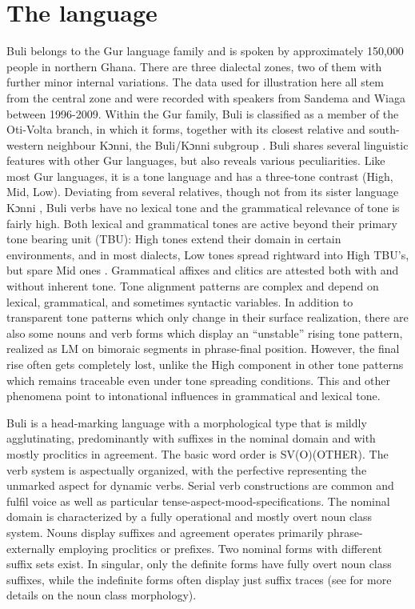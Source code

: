 \documentclass[output=paper]{langsci/langscibook}
\begin{document}
\section{ The language}

Buli belongs to the Gur language family and is spoken by approximately 150,000 people \citep{LewisEtAl2015} in northern Ghana. There are three dialectal zones, two of them with further minor internal variations. The data used for illustration here all stem from the central zone and were recorded with speakers from Sandema and Wiaga between 1996-2009. Within the Gur family, Buli is classified as a member of the Oti-Volta branch, in which it forms, together with its closest relative and south-western neighbour Kɔnni, the Buli/Kɔnni subgroup \citep{Manessy1979,Naden1989}. Buli shares several linguistic features with other Gur languages, but also reveals various peculiarities. Like most Gur languages, it is a tone language and has a three-tone contrast (High, Mid, Low). Deviating from several relatives, though not from its sister language Kɔnni \citep{Cahill2007}, Buli verbs have no lexical tone and the grammatical relevance of tone is fairly high. Both lexical and grammatical tones are active beyond their primary tone bearing unit (TBU): High tones extend their domain in certain environments, and in most dialects, Low tones spread rightward into High TBU’s, but spare Mid ones \citep{Schwarz2003,Schwarz2007}. Grammatical affixes and clitics are attested both with and without inherent tone. Tone alignment patterns are complex and depend on lexical, grammatical, and sometimes syntactic variables. In addition to transparent tone patterns which only change in their surface realization, there are also some nouns and verb forms which display an “unstable” rising tone pattern, realized as LM on bimoraic segments in phrase-final position. However, the final rise often gets completely lost, unlike the High component in other tone patterns which remains traceable even under tone spreading conditions. This and other phenomena point to intonational influences in grammatical and lexical tone.

Buli is a head-marking language with a morphological type that is mildly agglutinating, predominantly with suffixes in the nominal domain and with mostly proclitics in agreement. The basic word order is SV(O)(OTHER). The verb system is aspectually organized, with the perfective representing the unmarked aspect for dynamic verbs. Serial verb constructions are common and fulfil voice as well as particular tense-aspect-mood-specifications. The nominal domain is characterized by a fully operational and mostly overt noun class system. Nouns display suffixes and agreement operates primarily phrase-externally employing proclitics or prefixes. Two nominal forms with different suffix sets exist. In singular, only the definite forms have fully overt noun class suffixes, while the indefinite forms often display just suffix traces (see \citealt{Schwarz2007} for more details on the noun class morphology).
\end{document}
